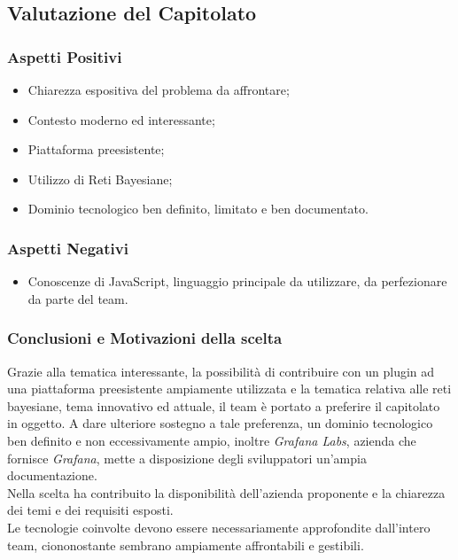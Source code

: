 \subsection{Valutazione del Capitolato}
\subsubsection{Aspetti Positivi}
\begin{itemize}
	\item Chiarezza espositiva del problema da affrontare;
	\item Contesto moderno ed interessante;
	\item Piattaforma preesistente;
	\item Utilizzo di Reti Bayesiane;
	\item Dominio tecnologico ben definito, limitato e ben documentato.
\end{itemize}

\subsubsection{Aspetti Negativi}
\begin{itemize}
	\item Conoscenze di JavaScript, linguaggio principale da utilizzare, da perfezionare da parte del team.
\end{itemize}

\subsubsection{Conclusioni e Motivazioni della scelta}
Grazie alla tematica interessante, la possibilità di contribuire con un plugin ad una piattaforma preesistente ampiamente utilizzata e la tematica relativa alle reti bayesiane, tema innovativo ed attuale, il team è portato a preferire il capitolato in oggetto. A dare ulteriore sostegno a tale preferenza, un dominio tecnologico ben definito e non eccessivamente ampio, inoltre \textit{Grafana Labs}, azienda che fornisce \textit{Grafana}, mette a disposizione degli sviluppatori un'ampia documentazione.\\
 Nella scelta ha contribuito la disponibilità dell'azienda proponente e la chiarezza dei temi e dei requisiti esposti.\\
Le tecnologie coinvolte devono essere necessariamente approfondite dall'intero team, ciononostante sembrano  ampiamente affrontabili e gestibili.
